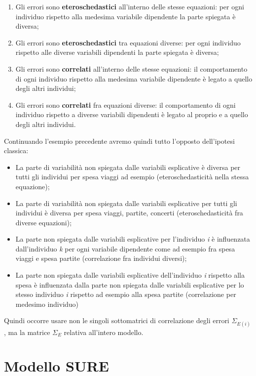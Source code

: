 \documentclass[a4page, 11pt]{article} %
\begin{document}
\begin{enumerate}[noitemsep]

\item Gli errori sono \textbf{eteroschedastici} all’interno delle stesse equazioni: per ogni individuo rispetto alla medesima variabile dipendente la parte spiegata è diversa;
\item Gli errori sono \textbf{eteroschedastici} tra equazioni diverse: per ogni individuo rispetto alle diverse variabili dipendenti la parte spiegata è diversa;
\item Gli errori sono \textbf{correlati} all’interno delle stesse equazioni: il comportamento di ogni individuo rispetto alla medesima variabile dipendente è legato a quello degli altri individui;
\item Gli errori sono \textbf{correlati} fra equazioni diverse: il comportamento di ogni individuo rispetto a diverse variabili dipendenti è legato al proprio e a quello degli altri individui.
\end{enumerate}
Continuando l'esempio precedente avremo quindi tutto l'opposto dell'ipotesi classica:
\begin{itemize}[noitemsep]
\item La parte di variabilità non spiegata dalle variabili esplicative è diversa per tutti gli individui per spesa viaggi ad esempio (eteroschedasticità nella stessa equazione);
\item La parte di variabilità non spiegata dalle variabili esplicative per tutti gli individui è diversa  per spesa viaggi, partite, concerti (eteroschedasticità fra diverse equazioni);
\item La parte non spiegata dalle variabili esplicative per l'individuo \textit{i} è influenzata dall’individuo \textit{k} per ogni variabile dipendente come ad esempio fra spesa viaggi e spesa partite (correlazione fra individui diversi);
\item La parte non spiegata dalle variabili esplicative dell’individuo \textit{i} rispetto alla spesa  è influenzata dalla parte non spiegata dalle variabili esplicative per lo stesso individuo \textit{i} rispetto ad esempio alla spesa partite (correlazione per medesimo individuo)
\end{itemize}
Quindi occorre usare non le singoli sottomatrici di correlazione degli errori $\Sigma_{E(i)}$, ma la matrice $\Sigma_E$ relativa all’intero modello.

\section{Modello SURE}
\end{document}
